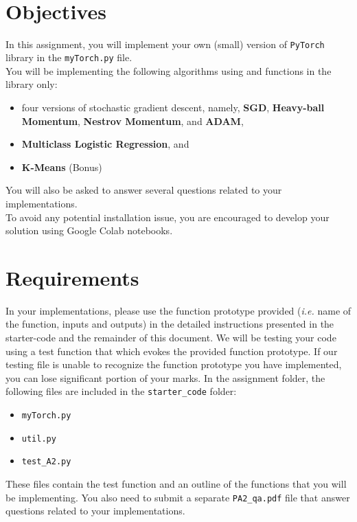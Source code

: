 \documentclass{article}
\title{\vspace{-2.5cm}\textbf{\coursefullname}\\\hatypeandnun\\\haname}
\date{}
\theoremstyle{definition}
\begin{document}
\maketitle
\vspace*{-2cm}
\section*{Objectives}
In this assignment, you will implement your own (small) version of \verb|PyTorch| library in the \verb|myTorch.py| file.\\

You will be implementing the following algorithms using  and functions in the  library only: 
\begin{itemize}
	\item four versions of stochastic gradient descent, namely, \textbf{SGD}, \textbf{Heavy-ball Momentum}, \textbf{Nestrov Momentum}, and \textbf{ADAM},
	\item \textbf{Multiclass Logistic Regression}, and
	\item \textbf{K-Means} (Bonus)
\end{itemize}
You will also be asked to answer several questions related to your implementations.\\

To avoid any potential installation issue, you are encouraged to develop your solution using Google Colab notebooks.
\section*{Requirements}
In your implementations, please use the function prototype provided (\textit{i.e.} name of the function, inputs and
outputs) in the detailed instructions presented in the starter-code and the remainder of this document. We will be testing your
code using a test function that which evokes the provided function prototype. If our testing file is unable to
recognize the function prototype you have implemented, you can lose significant portion of your marks. In
the  assignment folder, the following files are included in the \verb|starter_code| folder:
\begin{itemize}
	\item \verb|myTorch.py|
	\item \verb|util.py|
	\item \verb|test_A2.py|
\end{itemize}
These  files contain the test function and an outline of the functions that you will be implementing. You also
need  to submit a separate \verb|PA2_qa.pdf| file that answer questions related to your implementations.
\end{document}
